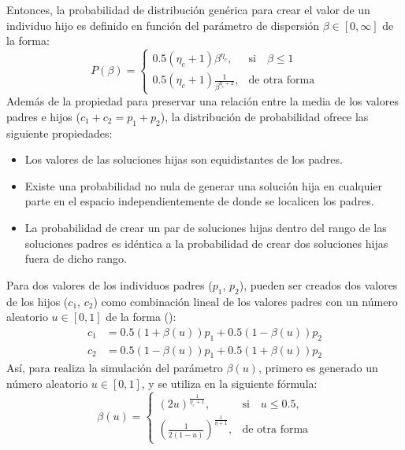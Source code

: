 %
Entonces, la probabilidad de distribución genérica para crear el valor de un individuo hijo es definido en función del parámetro de dispersión $\beta \in [0, \infty]$ de la forma:
\begin{equation}
    P(\beta)= 
\begin{cases}
     0.5(\eta_c + 1)\beta^{\eta_c},& \text{si} \quad \beta \leq 1\\
     0.5(\eta_c + 1) \frac{1}{\beta^{\eta_c + 2}} ,& \text{de otra forma}
\end{cases}
\end{equation}
Además de la propiedad para preservar una relación entre la media de los valores padres e hijos ($c_1 + c_2 = p_1 + p_2$), la distribución de probabilidad ofrece las siguiente propiedades:
\begin{itemize}
\item Los valores de las soluciones hijas son equidistantes de los padres.
\item Existe una probabilidad no nula de generar una solución hija en cualquier parte en el espacio independientemente de donde se localicen los padres.
\item La probabilidad de crear un par de soluciones hijas dentro del rango de las soluciones padres es idéntica a la probabilidad de crear dos soluciones hijas fuera de dicho rango.
\end{itemize}

Para dos valores de los individuos padres ($p_1$, $p_2$), pueden ser creados dos valores  de los hijos ($c_1$, $c_2$) como combinación lineal de los valores padres con un número aleatorio $u \in [0, 1]$ de la forma (\cite{Joel:SBX1994}):
\begin{equation} \label{eq:generar_ind}
\begin{split}
c_1 &= 0.5(1 + \beta(u))p_1 + 0.5(1 - \beta(u)) p_2 \\
c_2 &= 0.5(1 - \beta(u))p_1 + 0.5(1 + \beta(u)) p_2
\end{split}
\end{equation}
%
Así, para realiza la simulación del parámetro $\beta(u)$, primero es generado un número aleatorio $u \in [0, 1]$, y se utiliza en la siguiente fórmula:
\begin{equation} \label{eq:Parametro_beta}
    \beta(u)= 
\begin{cases}
     (2u)^{\frac{1}{\eta_c+1}},& \text{si} \quad u \leq 0.5,\\
     	(\frac{1}{2(1-u)})^{\frac{1}{\eta+1}} ,& \text{de otra forma}
\end{cases}
\end{equation}


